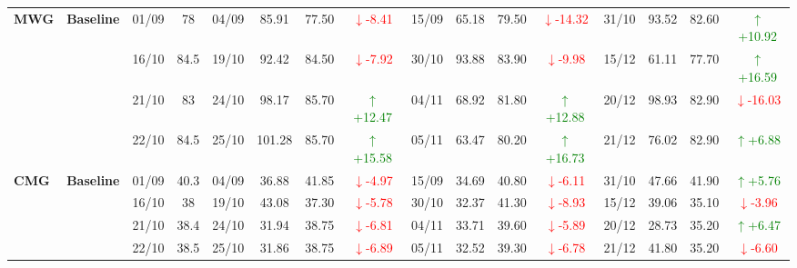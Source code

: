 \documentclass{ieeeaccess}
\begin{document}
{\begin{longtable}{llcc|cccc|cccc|cccc}
\multirow{4}{*}{\textbf{MWG}}
& \textbf{Baseline}
& 01/09 & 78 & 04/09 & 85.91 & 77.50 & \textcolor{red}{\(\downarrow\)-8.41} & 15/09 & 65.18 & 79.50 & \textcolor{red}{\(\downarrow\)-14.32} & 31/10 & 93.52 & 82.60 & \textcolor{green}{\(\uparrow\)+10.92} \\
& & 16/10 & 84.5 & 19/10 & 92.42 & 84.50 & \textcolor{red}{\(\downarrow\)-7.92} & 30/10 & 93.88 & 83.90 & \textcolor{red}{\(\downarrow\)-9.98} & 15/12 & 61.11 & 77.70 & \textcolor{green}{\(\uparrow\)+16.59} \\
& & 21/10 & 83 & 24/10 & 98.17 & 85.70 & \textcolor{green}{\(\uparrow\)+12.47} & 04/11 & 68.92 & 81.80 & \textcolor{green}{\(\uparrow\)+12.88} & 20/12 & 98.93 & 82.90 & \textcolor{red}{\(\downarrow\)-16.03} \\
& & 22/10 & 84.5 & 25/10 & 101.28 & 85.70 & \textcolor{green}{\(\uparrow\)+15.58} & 05/11 & 63.47 & 80.20 & \textcolor{green}{\(\uparrow\)+16.73} & 21/12 & 76.02 & 82.90 & \textcolor{green}{\(\uparrow\)+6.88} \\
\midrule

\multirow{4}{*}{\textbf{CMG}}
& \textbf{Baseline}
& 01/09 & 40.3 & 04/09 & 36.88 & 41.85 & \textcolor{red}{\(\downarrow\)-4.97} & 15/09 & 34.69 & 40.80 & \textcolor{red}{\(\downarrow\)-6.11} & 31/10 & 47.66 & 41.90 & \textcolor{green}{\(\uparrow\)+5.76} \\
& & 16/10 & 38 & 19/10 & 43.08 & 37.30 & \textcolor{red}{\(\downarrow\)-5.78} & 30/10 & 32.37 & 41.30 & \textcolor{red}{\(\downarrow\)-8.93} & 15/12 & 39.06 & 35.10 & \textcolor{red}{\(\downarrow\)-3.96} \\
& & 21/10 & 38.4 & 24/10 & 31.94 & 38.75 & \textcolor{red}{\(\downarrow\)-6.81} & 04/11 & 33.71 & 39.60 & \textcolor{red}{\(\downarrow\)-5.89} & 20/12 & 28.73 & 35.20 & \textcolor{green}{\(\uparrow\)+6.47} \\
& & 22/10 & 38.5 & 25/10 & 31.86 & 38.75 & \textcolor{red}{\(\downarrow\)-6.89} & 05/11 & 32.52 & 39.30 & \textcolor{red}{\(\downarrow\)-6.78} & 21/12 & 41.80 & 35.20 & \textcolor{red}{\(\downarrow\)-6.60} \\
\midrule


\end{longtable}}
\end{document}
